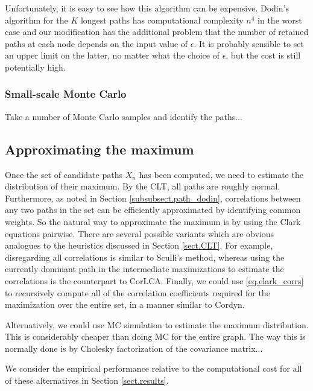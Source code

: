 \documentclass[12pt]{article}
\begin{document}
Unfortunately, it is easy to see how this algorithm can be expensive. Dodin's algorithm for the $K$ longest paths has computational complexity $n^4$ in the worst case and our modification has the additional problem that the number of retained paths at each node depends on the input value of $\epsilon$. It is probably sensible to set an upper limit on the latter, no matter what the choice of $\epsilon$, but the cost is still potentially high.

\subsubsection{Small-scale Monte Carlo}
\label{subsubsect.path_mc}

Take a number of Monte Carlo samples and identify the paths...
 
\subsection{Approximating the maximum}
\label{subsect.path_approx}

Once the set of candidate paths $X_n$ has been computed, we need to estimate the distribution of their maximum. By the CLT, all paths are roughly normal. Furthermore, as noted in Section \ref{subsubsect.path_dodin}, correlations between any two paths in the set can be efficiently approximated by identifying common weights. So the natural way to approximate the maximum is by using the Clark equations pairwise. There are several possible variants which are obvious analogues to the heuristics discussed in Section \ref{sect.CLT}. For example, disregarding all correlations is similar to Sculli's method, whereas using the currently dominant path in the intermediate maximizations to estimate the correlations is the counterpart to CorLCA. Finally, we could use \eqref{eq.clark_corrs} to recursively compute all of the correlation coefficients required for the maximization over the entire set, in a manner similar to Cordyn.

Alternatively, we could use MC simulation to estimate the maximum distribution. This is considerably cheaper than doing MC for the entire graph. The way this is normally done is by Cholesky factorization of the covariance matrix...  

We consider the empirical performance relative to the computational cost for all of these alternatives in Section \ref{sect.results}.
\end{document}
